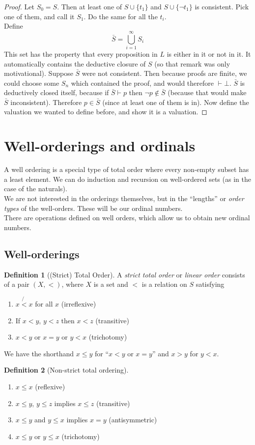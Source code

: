 \documentclass{article}
\theoremstyle{definition}
\newtheorem{definition}{Definition}
\numberwithin{definition}{section}
\newcommand{\proves}{\vdash}
\begin{document}
\begin{proof}
Let $S_{0} = S$. Then at least one of $S \cup \{t_{1}\}$ and $S \cup \{\neg t_{1}\}$ is consistent. Pick one of them, and call it $S_{1}$. Do the same for all the $t_{i}$. \\
Define $$\bar{S} = \bigcup_{i=1}^{\infty} S_{i}$$
This set has the property that every proposition in $L$ is either in it or not in it. It automatically contains the deductive closure of $S$ (so that remark was only motivational). Suppose $\bar{S}$ were not consistent. Then because proofs are finite, we could choose some $S_{n}$ which contained the proof, and would therefore $\proves \bot$. $\bar{S}$ is deductively closed itself, because if $\bar{S} \proves p$ then $\neg p \notin \bar{S}$ (because that would make $\bar{S}$ inconsistent). Therefore $p \in \bar{S}$ (since at least one of them is in). Now define the valuation we wanted to define before, and show it is a valuation. 
\end{proof}

\section{Well-orderings and ordinals}
A well ordering is a special type of total order where every non-empty subset has a least element. We can do induction and recursion on well-ordered sets (as in the case of the naturals). \\
We are not interested in the orderings themselves, but in the ``lengths'' or \textit{order types} of the well-orders. These will be our ordinal numbers. \\
There are operations defined on well orders, which allow us to obtain new ordinal numbers. \\
\subsection{Well-orderings}
\begin{definition}[(Strict) Total Order]
A \textit{strict total order} or \textit{linear order} consists of a pair $(X,<)$, where $X$ is a set and $<$ is a relation on $S$ satisfying
\begin{enumerate}[i]
\item $ x \not{<} x$ for all $x$ (irreflexive)
\item If $x<y$, $y<z$ then $x<z$ (transitive)
\item $x<y$ or $x=y$ or $y<x$ (trichotomy)
\end{enumerate}
\end{definition}
We have the shorthand $x \le y$ for ``$x<y$ or $x=y$'' and $x>y$ for $y<x$. \\
\begin{definition}[Non-strict total ordering]
\begin{enumerate}[i]
\item $x \le x$ (reflexive) 
\item $x \le y$, $y \le z$ implies $x \le z$ (transitive) 
\item $x \le y$ and $y \le x$ implies $x=y$ (antisymmetric)
\item $x \le y$ or $y \le x$ (trichotomy)
\end{enumerate}
\end{definition}
\end{document}
